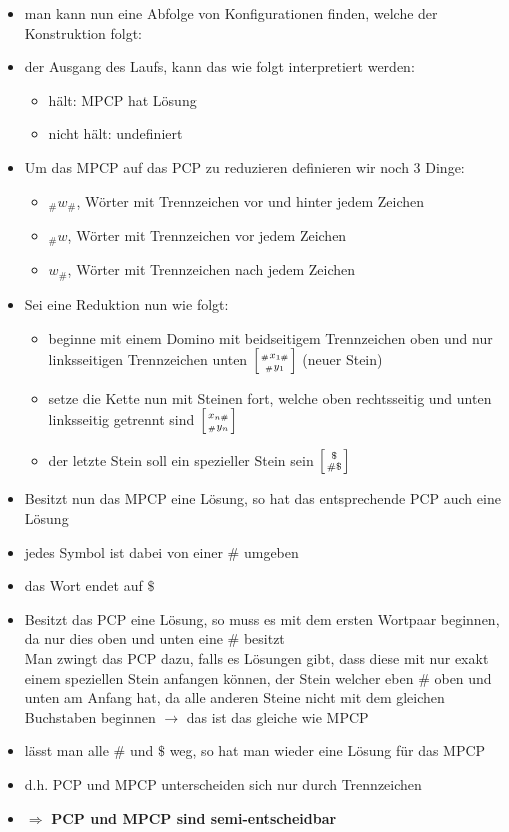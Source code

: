 \documentclass[12pt,a4paper]{article}
\begin{document}
\begin{itemize}
\item man kann nun eine Abfolge von Konfigurationen finden, welche der Konstruktion folgt:
\item der Ausgang des Laufs, kann das wie folgt interpretiert werden:\\
\begin{itemize}
\item hält: MPCP hat Lösung
\item nicht hält: undefiniert
\end{itemize}
\item Um das MPCP auf das PCP zu reduzieren definieren wir noch 3 Dinge:
\begin{itemize}
\item $_\#w_\#$, Wörter mit Trennzeichen vor und hinter jedem Zeichen
\item $_\#w$, Wörter mit Trennzeichen vor jedem Zeichen
\item $w_\#$, Wörter mit Trennzeichen nach jedem Zeichen
\end{itemize}
\item Sei eine Reduktion nun wie folgt:
\begin{itemize}
\item beginne mit einem Domino mit beidseitigem Trennzeichen oben und nur linksseitigen Trennzeichen unten
$ \left[ { _\#x_{1\#} \atop _\#y_1 } \right]$ (neuer Stein)
\item setze die Kette nun mit Steinen fort, welche oben rechtsseitig und unten linksseitig getrennt sind
$ \left[ { x_{n\#} \atop _\#y_n } \right]$
\item der letzte Stein soll ein spezieller Stein sein
$ \left[ { \$ \atop \# \$ } \right]$
\end{itemize}
\item Besitzt nun das MPCP eine Lösung, so hat das entsprechende PCP auch eine Lösung
\item jedes Symbol ist dabei von einer $\#$ umgeben
\item das Wort endet auf $\$ $
\item Besitzt das PCP eine Lösung, so muss es mit dem ersten Wortpaar beginnen, da nur dies oben und unten eine $ \# $ besitzt\\
Man zwingt das PCP dazu, falls es Lösungen gibt, dass diese mit nur exakt einem speziellen Stein anfangen können, der Stein welcher eben $\#$ oben und unten am Anfang hat, da alle anderen Steine nicht mit dem gleichen Buchstaben beginnen $\rightarrow$ das ist das gleiche wie MPCP
\item lässt man alle $ \# $ und  $ \$ $ weg, so hat man wieder eine Lösung für das MPCP
\item d.h. PCP und MPCP unterscheiden sich nur durch Trennzeichen
\item $\Rightarrow$ \textbf{PCP und MPCP sind semi-entscheidbar}
\end{itemize}
\end{document}

